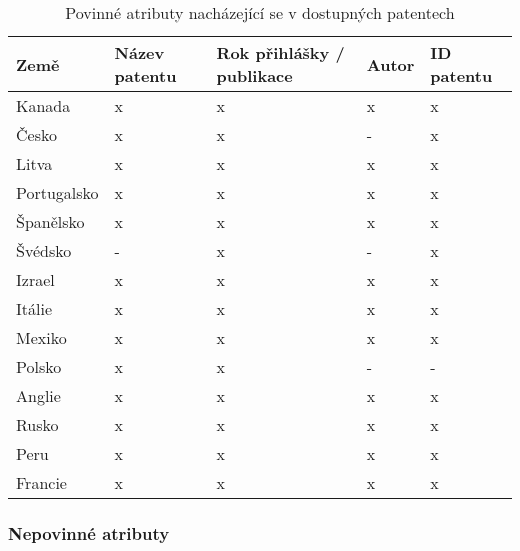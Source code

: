 	\begin{table}[H]
	\centering
	\begin{tabular}{|>{\centering\arraybackslash}p{2.2cm}|>{\centering\arraybackslash}p{2cm}|>{\centering\arraybackslash}p{3cm}|>{\centering\arraybackslash}p{2cm}|>{\centering\arraybackslash}p{2.5cm}|} 
	\hline
	\textbf{Země}    & \textbf{Název patentu} & \textbf{Rok přihlášky / publikace} & \textbf{Autor} & \textbf{ID patentu}                \\ 
	\hline
	Kanada & x & x & x & x \\
	\hline
	Česko & x & x & - & x \\
	\hline
	Litva & x & x & x & x \\
	\hline
	Portugalsko & x & x & x & x \\
	\hline
	Španělsko & x & x & x & x \\
	\hline
	Švédsko & - & x & - & x \\
	\hline
	Izrael & x & x & x & x \\
	\hline
	Itálie & x & x & x & x \\
	\hline
	Mexiko & x & x & x & x \\
	\hline
	Polsko & x & x & - & - \\
	\hline
	Anglie & x & x & x & x \\
	\hline
	Rusko & x & x & x & x \\
	\hline
	Peru & x & x & x & x \\
	\hline
	Francie & x & x & x & x \\
	\hline
	\end{tabular}
	\caption{Povinné atributy nacházející se v dostupných patentech}
	\label{tab:table_attributes_critical}
	\end{table}

\subsubsection{Nepovinné atributy}

